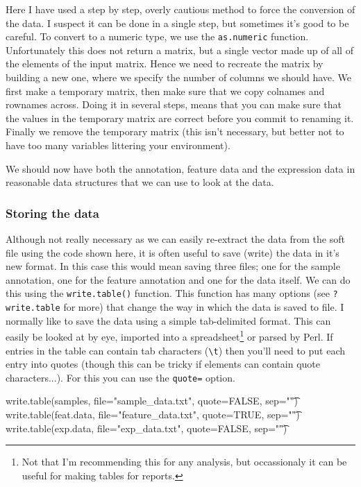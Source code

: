 \documentclass[11pt]{article}
\begin{document}
Here I have used a step by step, overly cautious method to force the conversion of the
data. I suspect it can be done in a single step, but sometimes it's good to be
careful. To convert to a numeric type, we use the \texttt{as.numeric} function.
Unfortunately this does not return a matrix, but a single vector made up of
all of the elements of the input matrix. Hence we need to recreate the matrix
by building a new one, where we specify the number of columns we should have.
We first make a temporary matrix, then make sure that we copy colnames
and rownames across. Doing it in several steps, means that you can make sure
that the values in the temporary matrix are correct before you commit to renaming
it. Finally we remove the temporary matrix (this isn't necessary, but better not
to have too many variables littering your environment).

We should now have both the annotation, feature data and the expression
data in reasonable data structures that we can use to look at the data.

\subsubsection{Storing the data}
\label{sec-1-2-3}
Although not really necessary as we can easily re-extract the
data from the soft file using the code shown here, it is often
useful to save (write) the data in it's new format. In this case
this would mean saving three files; one for the sample annotation,
one for the feature annotation and one for the data itself.
We can do this using the \texttt{write.table()} function. This
function has many options (see \texttt{?write.table} for more)
that change the way in which the data is saved to file. I normally
like to save the data using a simple tab-delimited format. This
can easily be looked at by eye, imported into a spreadsheet\footnote{
Not that I'm recommending this for any analysis, but occassionaly
it can be useful for making tables for reports.} or parsed
by Perl. If entries in the table can contain tab characters (\verb|\t|)
then you'll need to put each entry into quotes (though this can
be tricky if elements can contain quote characters...). For this you can
use the \texttt{quote=} option.

\begin{rcode}
  write.table(samples, file="sample_data.txt", quote=FALSE, sep="\t")
  write.table(feat.data, file="feature_data.txt", quote=TRUE, sep="\t")
  write.table(exp.data, file="exp_data.txt", quote=FALSE, sep="\t")
\end{rcode}
\end{document}
